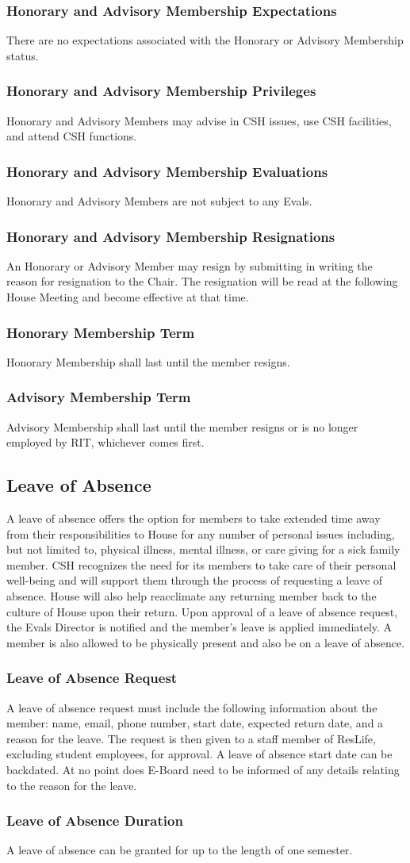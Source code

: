 \documentclass{article}
\newcommand{\asection}[1]{\subsection{#1} \label{#1}}
\newcommand{\asubsection}[1]{\subsubsection{#1} \label{#1}}
\begin{document}
\asubsection{Honorary and Advisory Membership Expectations}
There are no expectations associated with the Honorary or Advisory Membership status.

\asubsection{Honorary and Advisory Membership Privileges}
Honorary and Advisory Members may advise in CSH issues, use CSH facilities, and attend CSH functions.

\asubsection{Honorary and Advisory Membership Evaluations}
Honorary and Advisory Members are not subject to any Evals.

\asubsection{Honorary and Advisory Membership Resignations}
An Honorary or Advisory Member may resign by submitting in writing the reason for resignation to the Chair.
The resignation will be read at the following House Meeting and become effective at that time.

\asubsection{Honorary Membership Term}
Honorary Membership shall last until the member resigns.

\asubsection{Advisory Membership Term}
Advisory Membership shall last until the member resigns or is no longer employed by RIT, whichever comes first.

\asection{Leave of Absence}
A leave of absence offers the option for members to take extended time away from their responsibilities to House for any number of personal issues including, but not limited to, physical illness, mental illness, or care giving for a sick family member.
CSH recognizes the need for its members to take care of their personal well-being and will support them through the process of requesting a leave of absence.
House will also help reacclimate any returning member back to the culture of House upon their return.
Upon approval of a leave of absence request, the Evals Director is notified and the member's leave is applied immediately.
A member is also allowed to be physically present and also be on a leave of absence.

\asubsection{Leave of Absence Request}
A leave of absence request must include the following information about the member: name, email, phone number, start date, expected return date, and a reason for the leave.
The request is then given to a staff member of ResLife, excluding student employees, for approval.
A leave of absence start date can be backdated.
At no point does E-Board need to be informed of any details relating to the reason for the leave.

\asubsection{Leave of Absence Duration}
A leave of absence can be granted for up to the length of one semester.
\end{document}
